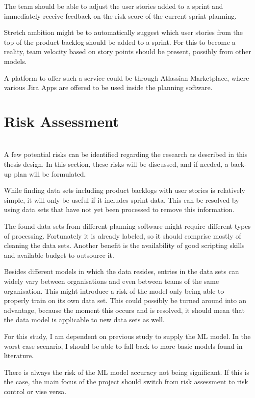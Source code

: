 \documentclass[sigconf]{acmart}
\begin{document}
The team should be able to adjust the user stories added to a sprint and immediately receive feedback on the risk score of the current sprint planning.

Stretch ambition might be to automatically suggest which user stories from the top of the product backlog should be added to a sprint. For this to become a reality, team velocity based on story points should be present, possibly from other models.

A platform to offer such a service could be through Atlassian Marketplace, where various Jira Apps are offered to be used inside the planning software.


\section{Risk Assessment}\\
A few potential risks can be identified regarding the research as described in this thesis design. In this section, these risks will be discussed, and if needed, a back-up plan will be formulated.

While finding data sets including product backlogs with user stories is relatively simple, it will only be useful if it includes sprint data. This can be resolved by using data sets that have not yet been processed to remove this information.

The found data sets from different planning software might require different types of processing. Fortunately it is already labeled, so it should comprise mostly of cleaning the data sets. Another benefit is the availability of good scripting skills and available budget to outsource it.

Besides different models in which the data resides, entries in the data sets can widely vary between organisations and even between teams of the same organisation. This might introduce a risk of the model only being able to properly train on its own data set. This could possibly be turned around into an advantage, because the moment this occurs and is resolved, it should mean that the data model is applicable to new data sets as well.

For this study, I am dependent on previous study to supply the ML model. In the worst case scenario, I should be able to fall back to more basic models found in literature.

There is always the risk of the ML model accuracy not being significant. If this is the case, the main focus of the project should switch from risk assessment to risk control or vise versa.
\end{document}
